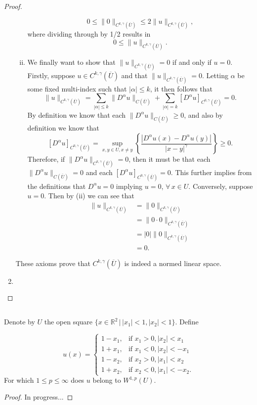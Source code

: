 \documentclass[11pt]{article}
\begin{document}
\begin{proof}
\begin{enumerate}[1.]
\begin{enumerate}[(i)]
					\[0 \leq \|0\|_{C^{k,\gamma}(\overline{U})} \leq 2\|u\|_{C^{k,\gamma}(\overline{U})},\]
					where dividing through by 1/2 results in
					\[0 \leq \|u\|_{C^{k,\gamma}(\overline{U})}.\]
				\item We finally want to show that $\|u\|_{C^{k,\gamma}(\overline{U})} = 0$ if and only if $u = 0$.
					Firstly, suppose $u \in C^{k,\gamma}(\overline{U})$ and that $\|u\|_{C^{k,\gamma}(\overline{U})} = 0$.
					Letting $\alpha$ be some fixed multi-index such that $|\alpha| \leq k$, it then follows that
					\[\|u\|_{C^{k,\gamma}(\overline{U})} = \sum_{|\alpha| \leq k}\|D^{\alpha}u\|_{C(\overline{U})} + \sum_{|\alpha| = k}[D^{\alpha}u]_{C^{0,\gamma}(\overline{U})} = 0.\]
					By definition we know that each $\|D^{\alpha}u\|_{C(\overline{U})} \geq 0$, and also by definition we know that
					\[[D^{\alpha}u]_{C^{0,\gamma}(\overline{U})} = \sup_{x,y \in U, x \not= y}{\left\{\frac{|D^{\alpha}u(x) - D^{\alpha}u(y)|}{|x-y|^{\gamma}}\right\}} \geq 0.\]
					Therefore, if $\|D^{\alpha}u\|_{C^{k,\gamma}(\overline{U})} = 0$, then it must be that each
					$\|D^{\alpha}u\|_{C(\overline{U})} = 0$ and each $[D^{\alpha}u]_{C^{0,\gamma}(\overline{U})} = 0$.
					This further implies from the definitions that $D^{\alpha}u = 0$ implying $u = 0$, $\forall \, x \in U$.
					Conversely, suppose $u = 0$. Then by (ii) we can see that
					\begin{align*}
						\|u\|_{C^{k,\gamma}(\overline{U})} &= \|0\|_{C^{k,\gamma}(\overline{U})} \\
										   &= \|0\cdot 0\|_{C^{k,\gamma}(\overline{U})} \\
										   &= |0|\|0\|_{C^{k,\gamma}(\overline{U})} \\
										   &= 0.
					\end{align*}
			\end{enumerate}
			These axioms prove that $C^{k,\gamma}(\overline{U})$ is indeed a normed linear space.
		\item 
	\end{enumerate}
\end{proof}

\newpage

\setcounter{subsection}{2}
\subsection{}
Denote by $U$ the open square $\{x \in \mathbb{R}^2 \, | \, |x_1| < 1, |x_2| < 1\}$. Define

\[
u(x) =
\begin{cases} 
	1 - x_1, & \text{if } x_1 > 0, |x_2| < x_1 \\
	1 + x_1, & \text{if } x_1 < 0, |x_2| < -x_1 \\
	1 - x_2, & \text{if } x_2 > 0, |x_1| < x_2 \\
	1 + x_2, & \text{if } x_2 < 0, |x_1| < -x_2.
\end{cases}
\]
For which $1 \leq p \leq \infty$ does $u$ belong to $W^{1,p}(U)$.
\begin{proof}
In progress...
\end{proof}
\end{document}
